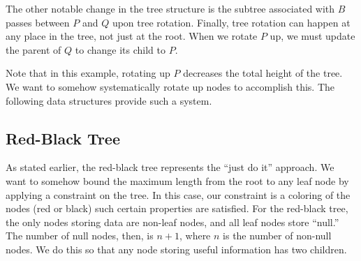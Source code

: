 The other notable change in the tree structure is the subtree associated with $B$ passes between $P$ and $Q$ upon tree rotation. Finally, tree rotation can happen at any place in the tree, not just at the root. When we rotate $P$ up, we must update the parent of $Q$ to change its child to $P$.

\begin{center}
\end{center}

Note that in this example, rotating up $P$ decreases the total height of the tree. We want to somehow systematically rotate up nodes to accomplish this. The following data structures provide such a system.

\subsection{Red-Black Tree}

As stated earlier, the red-black tree represents the ``just do it'' approach. We want to somehow bound the maximum length from the root to any leaf node by applying a constraint on the tree. In this case, our constraint is a coloring of the nodes (red or black) such certain properties are satisfied. For the red-black tree, the only nodes storing data are non-leaf nodes, and all leaf nodes store ``null.'' The number of null nodes, then, is $n+1$, where $n$ is the number of non-null nodes. We do this so that any node storing useful information has two children.

